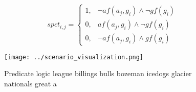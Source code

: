 \documentclass[a4paper]{article}
\begin{document}
\begin{equation}
spct_{i,j} =
\begin{cases}
1, & \text{$\neg af(a_j,g_i) \wedge \neg gf(g_i)$}\\
0, & \text{$af(a_j,g_i) \wedge \neg gf(g_i)$}\\
0, & \text{$\neg af(a_j,g_i) \wedge gf(g_i)$}
\end{cases}
\end{equation}

\begin{figure}
\centering
\texttt{[image: ../scenario\_visualization.png]}
\caption{Predicate logic league billings bulls bozeman icedogs glacier nationals great a
}
\end{figure}
 
\end{document}
